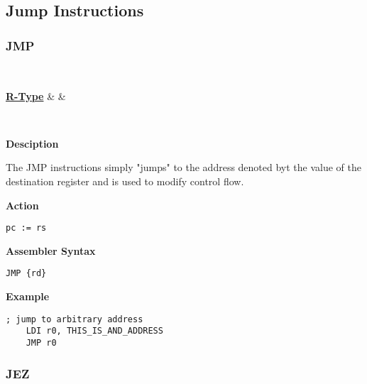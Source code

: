 \subsection{Jump Instructions}

\subsubsection{JMP }\label{sec:JMP}

\vspace{3ex}

\begin{center}
	\begin{bytefield}[leftcurly=., leftcurlyspace=0pt]{32}
		 \\
		\begin{leftwordgroup}{\hyperref[sec:r-type]{\textbf{R-Type}}}
		 & 
		 &
		\end{leftwordgroup}\\
	\end{bytefield}
\end{center}

\textbf{Desciption}

The JMP instructions simply "jumps" to the address denoted byt the value of the destination register and is used to modify control flow.

\vspace{3ex}

\textbf{Action}
\begin{lstlisting}[frame=single]
	pc := rs
\end{lstlisting}

\vspace{3ex}

\textbf{Assembler Syntax}
\begin{lstlisting}[frame=single]
	JMP {rd}
\end{lstlisting}

\vspace{3ex}

\textbf{Example}
\begin{lstlisting}[frame=single]
	; jump to arbitrary address
	LDI r0, THIS_IS_AND_ADDRESS
	JMP r0
\end{lstlisting}

\subsubsection{JEZ }\label{sec:JEZ}
 

